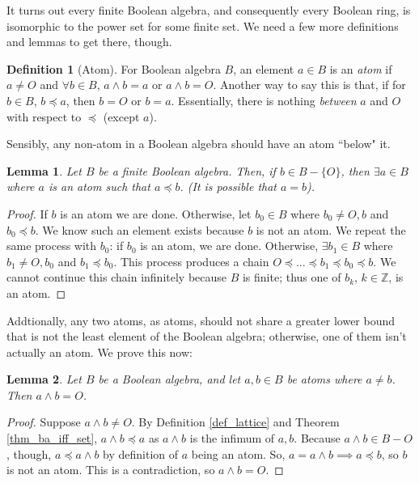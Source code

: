 \documentclass[10pt, letterpaper]{article}
\newcommand{\Z}{\mathbb{Z}}
\newcommand{\set}[1]{\{#1\}}
\newtheorem{lemma}{Lemma}
\theoremstyle{definition}
\newtheorem{definition}{Definition}[section]
\begin{document}
It turns out every finite Boolean algebra, and consequently every Boolean ring,
is isomorphic to the power set for some finite set. We need a few more definitions and lemmas
to get there, though.

\begin{definition}[Atom]
	For Boolean algebra \(B\), an element \(a\in B\) is an \textit{atom} if \(a\neq O\) and
	\(\forall b\in B\), \(a\wedge b = a\) or \(a\wedge b=O\).
	Another way to say this is that, if for \(b\in B\), \(b\preceq a\), 
	then \(b=O\) or \(b=a\). Essentially, there is nothing \textit{between}
	\(a\) and \(O\) with respect to \(\preceq\) (except \(a\)).
\end{definition}

Sensibly, any non-atom in a Boolean algebra should have an atom ``below" it.

\begin{lemma}
	Let \(B\) be a finite Boolean algebra. Then, if \(b\in B-\set{O}\), then
	\(\exists a\in B\) where \(a\) is an atom such that \(a\preceq b\).
	(It is possible that \(a=b\)).
\end{lemma}
\begin{proof}
	If \(b\) is an atom we are done. Otherwise, let \(b_0\in B\) where \(b_0\neq O, b\) and
	\(b_0\preceq b\). We know such an element exists because \(b\) is not an atom.
	We repeat the same process with \(b_0\): if \(b_0\) is an atom, we are done. Otherwise,
	\(\exists b_1\in B\) where \(b_1\neq O, b_0\) and \(b_1\preceq b_0\). 
	This process produces a chain \(O\preceq ...\preceq b_1\preceq b_0\preceq b\). 
	We cannot continue this chain infinitely because \(B\) is finite; thus one of
	\(b_k\), \(k\in\Z\), is an atom.
\end{proof}

Addtionally, any two atoms, as atoms, should not share a greater lower bound that
is not the least element of the Boolean algebra; otherwise, one of them isn't 
actually an atom. We prove this now:
\begin{lemma}
	Let \(B\) be a Boolean algebra, and let \(a,b\in B\) be atoms where \(a\neq b\).
	Then \(a\wedge b = O\).
\end{lemma}
\begin{proof}
	Suppose \(a\wedge b\neq O\).
	By Definition \ref{def_lattice} and Theorem \ref{thm_ba_iff_set},
	\(a\wedge b\preceq a\) as \(a\wedge b\) is the infimum of \(a,b\).
	Because \(a\wedge b\in B-{O}\), though, \(a\preceq a\wedge b\) by definition of
	\(a\) being an atom. So, \(a=a\wedge b\implies a\preceq b\), so \(b\) is not an atom.
	This is a contradiction, so \(a\wedge b = O\).
\end{proof}
\end{document}
